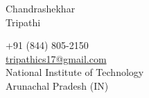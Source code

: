 \documentclass[]{article}
\begin{document}
\begin{multicols}{2}
  \begin{flushleft}
    {
      \fontsize{30pt}{10pt}
      \noindent
      {Chandrashekhar\\
      Tripathi}
      \columnbreak\\
    } 
  \end{flushleft}
  \begin{flushright}
    {
      +91 (844) 805-2150\\
      \href{mailto:tripathics17@gmail.com}{tripathics17@gmail.com}\\
      National Institute of Technology\\
      Arunachal Pradesh (IN)
    }
  \end{flushright}
\end{multicols}


\begin{multicols}{2}
  
\end{multicols}
\end{document}
